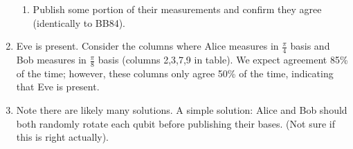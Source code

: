 \documentclass[12pt]{article}
\begin{document}
\begin{enumerate}[font=\bfseries]
\begin{enumerate}
            \item Publish some portion of their measurements and confirm they agree (identically to BB84). 
        \end{enumerate}
    \item Eve is present. Consider the columns where Alice measures in $\frac{\pi}{4}$ basis and Bob measures in $\frac{\pi}{8}$ basis (columns 2,3,7,9 in table). We expect agreement 85\% of the time; however, these columns only agree 50\% of the time, indicating that Eve is present.
    \item Note there are likely many solutions. A simple solution: Alice and Bob should both randomly rotate each qubit before publishing their bases. (Not sure if this is right actually).
    
\end{enumerate}
\end{document}
